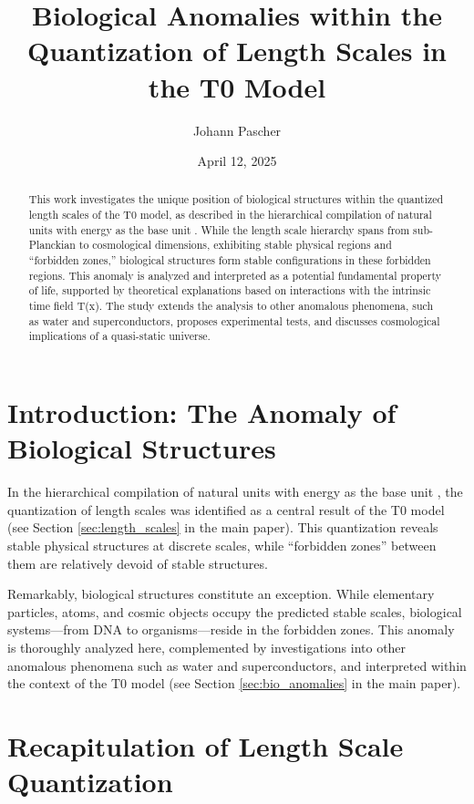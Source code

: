 \documentclass[12pt,a4paper]{article}
\title{Biological Anomalies within the Quantization of Length Scales in the T0 Model}
\author{Johann Pascher}
\date{April 12, 2025}
\newcommand{\Tfield}{T(x)}
\begin{document}
	
	\maketitle
	
	\begin{abstract}
		This work investigates the unique position of biological structures within the quantized length scales of the T0 model, as described in the hierarchical compilation of natural units with energy as the base unit \cite{pascher_alphabeta_2025}. While the length scale hierarchy spans from sub-Planckian to cosmological dimensions, exhibiting stable physical regions and ``forbidden zones,'' biological structures form stable configurations in these forbidden regions. This anomaly is analyzed and interpreted as a potential fundamental property of life, supported by theoretical explanations based on interactions with the intrinsic time field \Tfield. The study extends the analysis to other anomalous phenomena, such as water and superconductors, proposes experimental tests, and discusses cosmological implications of a quasi-static universe.
	\end{abstract}
	
	\tableofcontents
	\newpage
	
	\section{Introduction: The Anomaly of Biological Structures}
	\label{sec:introduction}
	
	In the hierarchical compilation of natural units with energy as the base unit \cite{pascher_alphabeta_2025}, the quantization of length scales was identified as a central result of the T0 model (see Section \ref{sec:length_scales} in the main paper). This quantization reveals stable physical structures at discrete scales, while ``forbidden zones'' between them are relatively devoid of stable structures.
	
	Remarkably, biological structures constitute an exception. While elementary particles, atoms, and cosmic objects occupy the predicted stable scales, biological systems—from DNA to organisms—reside in the forbidden zones. This anomaly is thoroughly analyzed here, complemented by investigations into other anomalous phenomena such as water and superconductors, and interpreted within the context of the T0 model (see Section \ref{sec:bio_anomalies} in the main paper).
	
	\section{Recapitulation of Length Scale Quantization}
	\label{sec:length_scales_recap}
	
\end{document}
